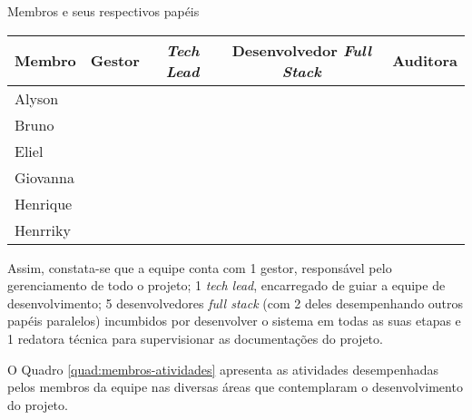 \begin{quadro}[ht]
	\setlength{\tabcolsep}{3pt}
	\begin{center}
		\caption{\label{frame:distribuicao-papeis}Membros e seus respectivos papéis}
		\begin{tabular}{|l|c|c|c|c|}
			\hline
			\textbf{Membro} & \textbf{Gestor} & \textbf{\textit{Tech Lead}} & \textbf{Desenvolvedor \textit{Full Stack}} & \textbf{Auditora} \\
			\hline
			Alyson & \checkmark &  & \checkmark &  \\
			\hline
			Bruno &  &  & \checkmark &  \\
			\hline
			Eliel &  &  & \checkmark &  \\
			\hline
			Giovanna &  &  &  & \checkmark \\
			\hline
			Henrique &  &  & \checkmark &  \\
			\hline
			Henrriky &  & \checkmark & \checkmark &  \\
			\hline
		\end{tabular}
	\end{center}
\end{quadro}

\indent Assim, constata-se que a equipe conta com 1 gestor, responsável pelo gerenciamento de todo o projeto; 1 \textit{tech lead}, encarregado de guiar a equipe de desenvolvimento; 5 desenvolvedores \textit{full stack} (com 2 deles desempenhando outros papéis paralelos) incumbidos por desenvolver o sistema em todas as suas etapas e 1 redatora técnica para supervisionar as documentações do projeto. 

O Quadro \ref{quad:membros-atividades} apresenta as atividades desempenhadas pelos membros da equipe nas diversas áreas que contemplaram o desenvolvimento do projeto.

